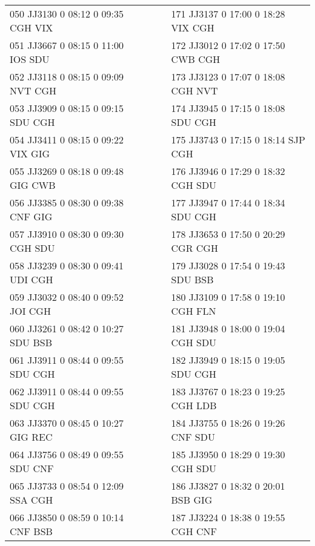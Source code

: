 \begin{scriptsize}
\begin{longtable}{l c c l}
050 JJ3130 0 08:12 0 09:35 CGH VIX & & & 171 JJ3137 0 17:00 0 18:28 VIX CGH \\

051 JJ3667 0 08:15 0 11:00 IOS SDU & & & 172 JJ3012 0 17:02 0 17:50 CWB CGH \\

052 JJ3118 0 08:15 0 09:09 NVT CGH & & & 173 JJ3123 0 17:07 0 18:08 CGH NVT \\

053 JJ3909 0 08:15 0 09:15 SDU CGH & & & 174 JJ3945 0 17:15 0 18:08 SDU CGH \\

054 JJ3411 0 08:15 0 09:22 VIX GIG & & & 175 JJ3743 0 17:15 0 18:14 SJP CGH \\

055 JJ3269 0 08:18 0 09:48 GIG CWB & & & 176 JJ3946 0 17:29 0 18:32 CGH SDU \\

056 JJ3385 0 08:30 0 09:38 CNF GIG & & & 177 JJ3947 0 17:44 0 18:34 SDU CGH \\

057 JJ3910 0 08:30 0 09:30 CGH SDU & & & 178 JJ3653 0 17:50 0 20:29 CGR CGH \\

058 JJ3239 0 08:30 0 09:41 UDI CGH & & & 179 JJ3028 0 17:54 0 19:43 SDU BSB \\

059 JJ3032 0 08:40 0 09:52 JOI CGH & & & 180 JJ3109 0 17:58 0 19:10 CGH FLN \\

060 JJ3261 0 08:42 0 10:27 SDU BSB & & & 181 JJ3948 0 18:00 0 19:04 CGH SDU \\

061 JJ3911 0 08:44 0 09:55 SDU CGH & & & 182 JJ3949 0 18:15 0 19:05 SDU CGH \\

062 JJ3911 0 08:44 0 09:55 SDU CGH & & & 183 JJ3767 0 18:23 0 19:25 CGH LDB \\

063 JJ3370 0 08:45 0 10:27 GIG REC & & & 184 JJ3755 0 18:26 0 19:26 CNF SDU \\

064 JJ3756 0 08:49 0 09:55 SDU CNF & & & 185 JJ3950 0 18:29 0 19:30 CGH SDU \\

065 JJ3733 0 08:54 0 12:09 SSA CGH & & & 186 JJ3827 0 18:32 0 20:01 BSB GIG \\

066 JJ3850 0 08:59 0 10:14 CNF BSB & & & 187 JJ3224 0 18:38 0 19:55 CGH CNF \\


\end{longtable}
\end{scriptsize}
